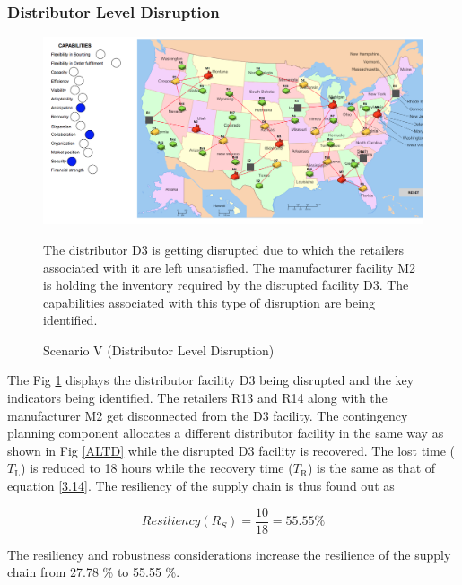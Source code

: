 \subsubsection{Distributor Level Disruption}

\begin{figure}[H]
  \centering
  \includegraphics[width=6.5in]{figures/pdf/S5DLD.png}\\
  \caption{Scenario V (Distributor Level Disruption)}
  {The distributor D3 is getting disrupted due to which the retailers associated with it are left unsatisfied. The manufacturer facility M2 is holding the inventory required by the disrupted facility D3. The capabilities associated with this type of disruption are being identified.}
  \label{S5DL}
\end{figure}   
 
The Fig \ref{S5DL} displays the distributor facility D3 being disrupted and the key indicators being identified. The retailers R13 and R14 along with the manufacturer M2 get disconnected from the D3 facility. The contingency planning component allocates a different distributor facility in the same way as shown in Fig \ref{ALTD} while the disrupted D3 facility is recovered. The lost time ($T_{\text{L}}$) is reduced to 18 hours while the recovery time ($T_{\text{R}}$) is the same as that of equation \ref{3.14}. The resiliency of the supply chain is thus found out as

\begin{equation}
    Resiliency(R_S) = \frac{10}{18} = 55.55 \% \label{3.29}
\end{equation}

The resiliency and robustness considerations increase the resilience of the supply chain from 27.78 \% to 55.55 \%.

